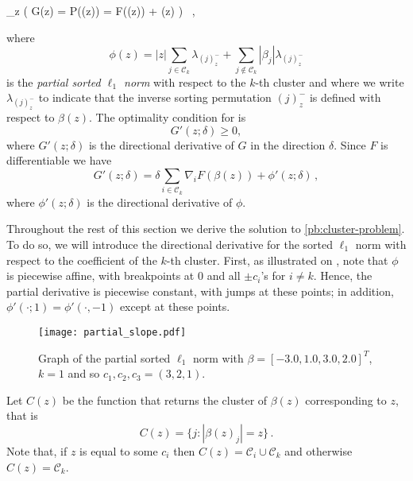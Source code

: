 \begin{problem}
\label{pb:cluster-problem}
\min_{z \in {}} \Big(
G(z) = P(\beta(z))  = F(\beta(z)) + \phi(z)
\Big) \,  ,
\end{problem}
where
\[
  \phi(z) = |z| \sum_{j \in \mathcal{C}_k} \lambda_{(j)^-_z}
  + \sum_{j \notin \mathcal{C}_k} |\beta_j| \lambda_{(j)^-_z}
\]
is the \emph{partial sorted \(\ell_1\) norm} with respect to the \(k\)-th cluster and where we write \(\lambda_{(j)^-_z}\) to indicate that the inverse sorting permutation \((j)^-_z\)
is defined with respect to \(\beta(z)\).
The optimality condition for  is
\[
  G'(z; \delta) \geq 0,
\]
where $G'(z; \delta) $ is the directional derivative of $G$ in the direction $\delta$.
Since \(F\) is differentiable we have
\[
  G'(z; \delta)  = \delta \sum_{i \in \mathcal{C}_k}\nabla_i F(\beta(z)) + \phi'(z; \delta) \, ,
\]
where \(\phi'(z; \delta)\) is the directional derivative of $\phi$.

Throughout the rest of this section we derive the solution to \eqref{pb:cluster-problem}.
To do so, we will introduce the directional derivative for the
sorted \(\ell_1\) norm with respect to the coefficient of the \(k\)-th cluster.
First, as illustrated on , note that $\phi$ is piecewise affine, with breakpoints at 0 and all $\pm c_i$'s for $i \neq k$.
Hence, the partial derivative is piecewise constant, with jumps at these points; in addition, $\phi'(\cdot; 1) = \phi'(\cdot, -1)$ except at these points.

\begin{figure}[htbp]
  \centering
  \texttt{[image: partial\_slope.pdf]}
  \caption{Graph of the partial sorted $\ell_1$ norm with \(\beta = [-3.0, 1.0, 3.0, 2.0]^T\), \(k = 1\) and so $c_1, c_2, c_3 = (3, 2, 1)$.}
  \label{fig:partial_slope}
\end{figure}

Let \(C(z)\) be the function that returns the cluster of $\beta(z)$ corresponding to \(z\), that is
\[
  C(z) = \{j : |\beta(z)_j| = z\} \,.
\]
Note that, if $z$ is equal to some $c_i$ then $C(z) = \mathcal{C}_i \cup \mathcal{C}_k$ and otherwise $C(z) = \mathcal{C}_k$.

